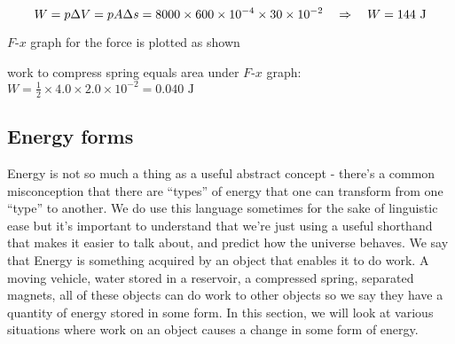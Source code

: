 \begin{soln}
    
 \begin{equation*}
W = p \Delta V = p A \Delta s = 8000 \times 600 \times 10^{-4} \times 30 \times 10^{-2} \quad \Rightarrow \quad W = 144 \text{ J} 
\end{equation*}
\end{soln}

\begin{marginfigure}
	\vspace*{-12pt}
	\centering
	\vspace*{-16pt}
\end{marginfigure}


\begin{soln} $F$-$x$ graph for the force is plotted as shown

work to compress spring equals area under $F$-$x$ graph:
	$ W = \frac{1}{2} \times 4.0 \times 2.0 \times 10^{-2} = 0.040 \text{ J} $

 
 \end{soln}
	



\subsection{Energy forms}\label{ch-KE}

Energy is not so much a thing as a useful abstract concept - there's a common misconception that there are ``types'' of energy that one can transform from one ``type'' to another. We do use this language sometimes for the sake of linguistic ease but it's important to understand that we're just using a useful shorthand that makes it easier to talk about, and predict how the universe behaves. We say that Energy is something acquired by an object that enables it to do work. A moving vehicle, water stored in a reservoir, a compressed spring, separated magnets, all of these objects can do work to other objects so we say they have a quantity of energy stored in some form. In this section, we will look at various situations where work on an object causes a change in some form of energy.

